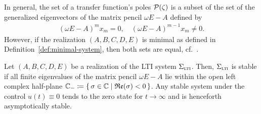 \begin{remark}
    In general, the set of a transfer function's poles $\mathcal{P}(\zeta)$ is a subset of the set of the generalized eigenvectors of the matrix pencil $\omega E - A$ defined by
    \begin{align*}
        {(\omega E - A)}^m x_m = 0,\quad {(\omega E - A)}^{m - 1} x_m \neq 0.
    \end{align*}
    However, if the realization $(A, B, C, D, E)$ is minimal as defined in Definition~\ref{def:minimal-system}, then both sets are equal, cf.~\cite[Section~2]{Benner2017}.
\end{remark}

\begin{definition}\label{def:lti-stability}
    Let $(A, B, C, D, E)$ be a realization of the \ac{LTI} system $\Sigma_{\textnormal{\scshape lti}}$.
    Then, $\Sigma_{\textnormal{\scshape lti}}$ is stable if all finite eigenvalues of the matrix pencil $\omega E - A$ lie within the open left complex half-plane $\mathbb{C}_{-} \coloneqq \left\{\,\sigma \in \mathbb{C}\mid\mathfrak{Re}(\sigma) < 0\,\right\}$.
    Any stable system under the control $u(t) \equiv 0$ tends to the zero state for $t \to \infty$ and is henceforth asymptotically stable.
\end{definition}
